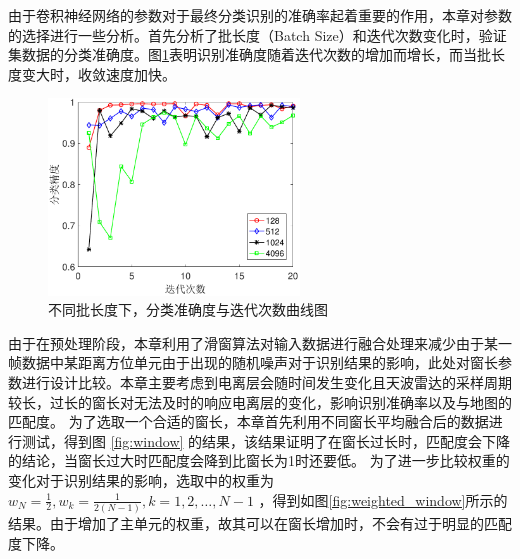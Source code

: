 由于卷积神经网络的参数对于最终分类识别的准确率起着重要的作用，本章对参数的选择进行一些分析。首先分析了批长度（Batch Size）和迭代次数变化时，验证集数据的分类准确度。图\ref{fig:epoch}表明识别准确度随着迭代次数的增加而增长，而当批长度变大时，收敛速度加快。
\begin{figure}[H]
	\centering
	\includegraphics[width=6.67cm]{figures/othr/epoch}
	\caption{不同批长度下，分类准确度与迭代次数曲线图}
	\label{fig:epoch}
\end{figure}

由于在预处理阶段，本章利用了滑窗算法对输入数据进行融合处理来减少由于某一帧数据中某距离方位单元由于出现的随机噪声对于识别结果的影响，此处对窗长参数进行设计比较。本章主要考虑到电离层会随时间发生变化且天波雷达的采样周期较长，过长的窗长对无法及时的响应电离层的变化，影响识别准确率以及与地图的匹配度。
为了选取一个合适的窗长，本章首先利用不同窗长平均融合后的数据进行测试，得到图 \ref{fig:window} 的结果，该结果证明了在窗长过长时，匹配度会下降的结论，当窗长过大时匹配度会降到比窗长为1时还要低。
为了进一步比较权重的变化对于识别结果的影响，选取中的权重为$w_N=\frac{1}{2},w_k=\frac{1}{2(N-1)},k=1,2,\dots,N-1$
，得到如图\ref{fig:weighted_window}所示的结果。由于增加了主单元的权重，故其可以在窗长增加时，不会有过于明显的匹配度下降。


